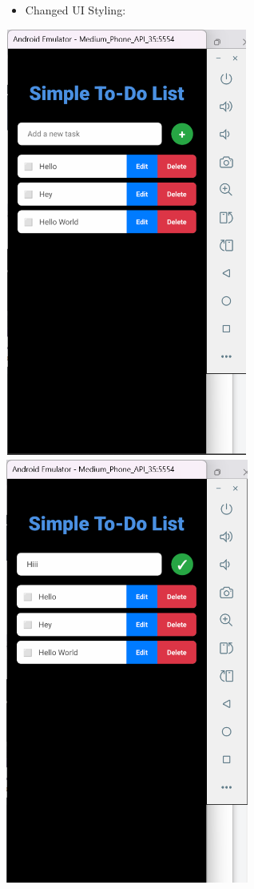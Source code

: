 \documentclass{article}
\begin{document}
\begin{itemize}
    \item Changed UI Styling:   
\end{itemize}
\includegraphics[width=3.14063in,height=5.53233in]{media/image38.png}
\includegraphics[width=3.14063in,height=5.53233in]{media/image39.png}
\end{document}
